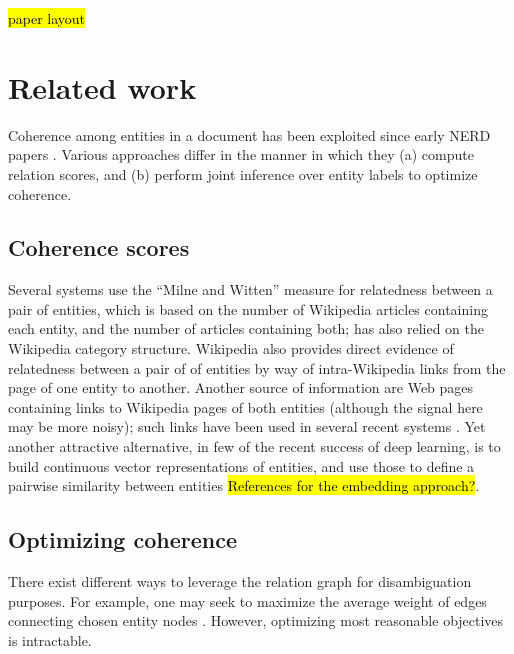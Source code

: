 \hl{paper layout}


\section{Related work}
\label{sec:related}

Coherence among entities in a document has been exploited since early NERD papers \cite{Cucerzan07,Milne2008}.  
Various approaches differ in the manner in which they (a) compute relation scores, and (b) perform joint inference over entity labels to optimize coherence. 

\subsection{Coherence scores}

Several systems \cite{Milne2008,KulkarniSRC09,Hoffart2011} use the ``Milne and Witten'' measure for relatedness between a pair of entities, which is based on the number of Wikipedia articles containing each entity, and the number of articles containing both; \cite{Cucerzan07} has also relied on the Wikipedia category structure. %
Wikipedia also provides direct evidence of relatedness between a pair of of entities by way of intra-Wikipedia links from the page of one entity to another. Another source of information are Web pages containing links to Wikipedia pages of both entities (although the signal here may be more noisy); such links have been used in several recent systems \cite{ChengR13,Chisholm2015}.  Yet another attractive alternative, in few of the recent success of deep learning, is to build continuous vector representations of entities, and use those to define a pairwise similarity between entities \hl{References for the embedding approach?}.


\subsection{Optimizing coherence}

There exist different ways to leverage the relation graph for disambiguation purposes.  For example, one may seek to maximize the average weight of edges connecting chosen entity nodes \cite{Milne2008,Ferragina10}.  However, optimizing most reasonable objectives is intractable.  %

